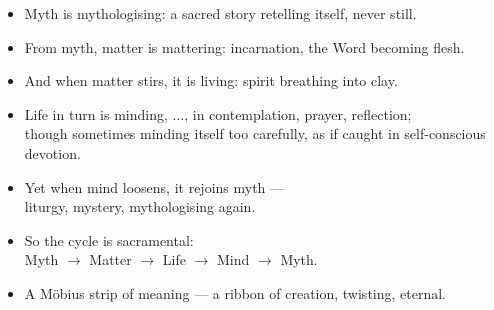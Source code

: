 \begin{itemize}[leftmargin=2cm,labelsep=1em]
    \item[\textbf{Eleanor:}] 
    Myth is mythologising: a sacred story retelling itself, never still.

    \item[\textbf{Priest:}] 
    From myth, matter is mattering: incarnation, the Word becoming flesh.

    \item[\textbf{Eleanor:}] 
    And when matter stirs, it is living: spirit breathing into clay.

    \item[\textbf{Priest:}] 
    Life in turn is minding, ..., in contemplation, prayer, reflection; \\
    though sometimes minding itself too carefully, as if caught in self-conscious devotion.

    \item[\textbf{Eleanor:}] 
    Yet when mind loosens, it rejoins myth — \\
    liturgy, mystery, mythologising again.

    \item[\textbf{Priest:}] 
    So the cycle is sacramental: \\
    Myth $\to$ Matter $\to$ Life $\to$ Mind $\to$ Myth.

    \item[\textbf{Eleanor:}] 
    A Möbius strip of meaning — a ribbon of creation, twisting, eternal.
\end{itemize}
